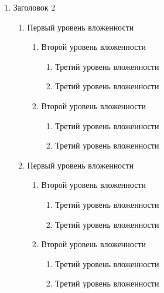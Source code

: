 \documentclass[a4paper,12pt]{article}
\begin{document}
\begin{enumerate}
\begin{enumerate}
\begin{enumerate}
\begin{enumerate}
                              \end{enumerate}
                    \end{enumerate}
          \end{enumerate}
    \item Заголовок 2
          \begin{enumerate}
              \item Первый уровень вложенности
                    \begin{enumerate}
                        \item Второй уровень вложенности
                              \begin{enumerate}
                                  \item Третий уровень вложенности
                                  \item Третий уровень вложенности
                              \end{enumerate}
                        \item Второй уровень вложенности
                              \begin{enumerate}
                                  \item Третий уровень вложенности
                                  \item Третий уровень вложенности
                              \end{enumerate}
                    \end{enumerate}
              \item Первый уровень вложенности
                    \begin{enumerate}
                        \item Второй уровень вложенности
                              \begin{enumerate}
                                  \item Третий уровень вложенности
                                  \item Третий уровень вложенности
                              \end{enumerate}
                        \item Второй уровень вложенности
                              \begin{enumerate}
                                  \item Третий уровень вложенности
                                  \item Третий уровень вложенности
                              \end{enumerate}
                    \end{enumerate}
          \end{enumerate}
\end{enumerate}
\end{document}
